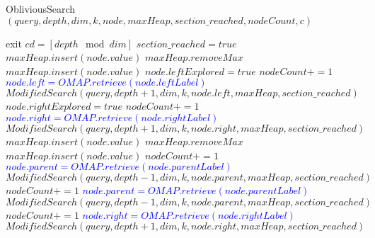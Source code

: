 \documentclass{article}
\begin{document}
\begin{algorithm}
    \caption{ObliviousSearch $(query, depth, dim, k, node, maxHeap, section\_reached, nodeCount, c)$}\label{alg:cap}
    \begin{algorithmic}
            \State exit
        \EndIf
        \State $cd = [depth \mod dim]$
                \State $section\_reached = true$
            \EndIf
                \State $maxHeap.insert(node.value)$
                \State $maxHeap.removeMax$
                \State $maxHeap.insert(node.value)$
            \EndIf
                \State $node.leftExplored = true$
                \State $nodeCount += 1$
                \textcolor{blue}{\State $node.left = OMAP.retrieve(node.leftLabel)$}
                \State $ModifiedSearch(query, depth+1, dim, k, node.left, maxHeap, section\_reached)$
                \State $node.rightExplored = true$
                \State $nodeCount += 1$
                \textcolor{blue}{\State $node.right = OMAP.retrieve(node.rightLabel)$}
                \State $ModifiedSearch(query, depth+1, dim, k, node.right, maxHeap, section\_reached)$
            \EndIf
        \Else
                \State $maxHeap.insert(node.value)$
                \State $maxHeap.removeMax$
                \State $maxHeap.insert(node.value)$
            \EndIf
                \State $nodeCount += 1$
                \textcolor{blue}{\State $node.parent = OMAP.retrieve(node.parentLabel)$}
                \State $ModifiedSearch(query, depth-1, dim, k, node.parent, maxHeap, section\_reached)$
            \Else
                    \State $nodeCount += 1$
                    \textcolor{blue}{\State $node.parent = OMAP.retrieve(node.parentLabel)$}
                    \State $ModifiedSearch(query, depth-1, dim, k, node.parent, maxHeap, section\_reached)$
                    \State $nodeCount += 1$
                    \textcolor{blue}{\State $node.right = OMAP.retrieve(node.rightLabel)$}
                    \State $ModifiedSearch(query, depth+1, dim, k, node.right, maxHeap, section\_reached)$

\end{algorithmic}
\end{algorithm}
\end{document}
